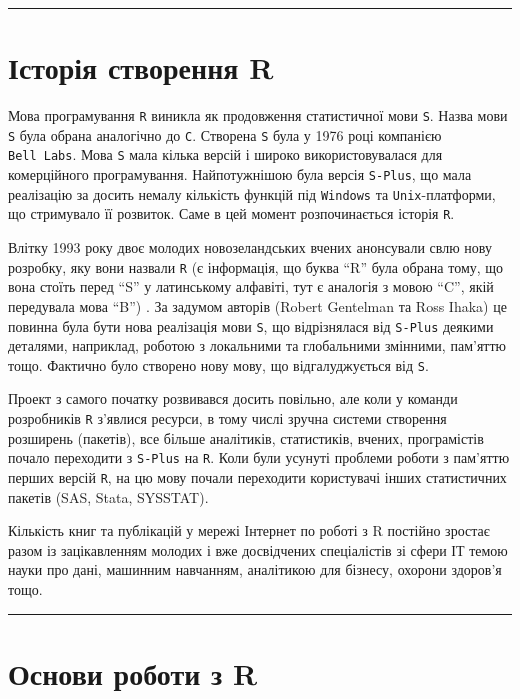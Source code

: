\documentclass[
]{book}
\begin{document}
\begin{center}\rule{0.5\linewidth}{0.5pt}\end{center}

\hypertarget{chapter12}{%
\section{Історія створення R}\label{chapter12}}

Мова програмування \texttt{R} виникла як продовження статистичної мови \texttt{S}. Назва мови \texttt{S} була обрана аналогічно до \texttt{C}. Створена \texttt{S} була у 1976 році компанією \texttt{Bell\ Labs}. Мова \texttt{S} мала кілька версій і широко використовувалася для комерційного програмування. Найпотужнішою була версія \texttt{S-Plus}, що мала реалізацію за досить немалу кількість функцій під \texttt{Windows} та \texttt{Unix}-платформи, що стримувало її розвиток. Саме в цей момент розпочинається історія \texttt{R}.

Влітку 1993 року двоє молодих новозеландських вчених анонсували свлю нову розробку, яку вони назвали \texttt{R} (є інформація, що буква ``R'' була обрана тому, що вона стоїть перед ``S'' у латинському алфавіті, тут є аналогія з мовою ``C'', якій передувала мова ``B'') \citep{R-stats-book}. За задумом авторів (Robert Gentelman та Ross Ihaka) це повинна була бути нова реалізація мови \texttt{S}, що відрізнялася від \texttt{S-Plus} деякими деталями, наприклад, роботою з локальними та глобальними змінними, пам'яттю тощо. Фактично було створено нову мову, що відгалуджується від \texttt{S}.

Проект з самого початку розвивався досить повільно, але коли у команди розробників \texttt{R} з'явлися ресурси, в тому числі зручна системи створення розширень (пакетів), все більше аналітиків, статистиків, вчених, програмістів почало переходити з \texttt{S-Plus} на \texttt{R}. Коли були усунуті проблеми роботи з пам'яттю перших версій \texttt{R}, на цю мову почали переходити користувачі інших статистичних пакетів (SAS, Stata, SYSSTAT).

Кількість книг та публікацій у мережі Інтернет по роботі з R постійно зростає разом із зацікавленням молодих і вже досвідчених спеціалістів зі сфери ІТ темою науки про дані, машинним навчанням, аналітикою для бізнесу, охорони здоров'я тощо.

\begin{center}\rule{0.5\linewidth}{0.5pt}\end{center}

\hypertarget{chapter13}{%
\section{Основи роботи з R}\label{chapter13}}
\end{document}
